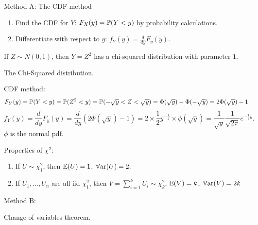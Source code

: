 \documentclass[10pt, a4paper]{article}
\begin{document}
Method A:
The CDF method
\begin{enumerate}[label = (\arabic*)]
    \item Find the CDF for $Y$:
    $F_{X}(y) = \P(Y < y)$ by probability calculations.

    \item Differentiate with respect to $y$:
    $f_Y(y) = \frac{d}{dy}F_y(y)$.
\end{enumerate}

\begin{definition}
    If $Z \sim N(0, 1)$,
    then $Y = Z ^ 2$ has a chi-squared distribution with parameter $1$.
\end{definition}


\begin{example}
    The Chi-Squared distribution.

    CDF method:
    \[
    F_Y(y) = \P(Y < y) = \P(Z ^ 2 < y) = \P(-\sqrt{y} < Z < \sqrt{y}) = \Phi(\sqrt{y}) - \Phi(-\sqrt{y}) = 2\Phi(\sqrt{y}) - 1
    \]
    \[
    f_{Y}(y) = \frac{d}{dy}F_y(y) = \frac{d}{dy}(2\Phi(\sqrt{y}) - 1) = 2 \times \frac{1}{2}y ^ {-\frac{1}{2}} \times \phi(\sqrt{y}) = \frac{1}{\sqrt{y}}\frac{1}{\sqrt{2\pi}}e ^ {-\frac{1}{2}y}.
    \]
    $\phi$ is the normal pdf.
\end{example}

Properties of $\chi ^ 2$:
\begin{enumerate}[label = (\roman*)]
    \item If $U \sim \chi_1 ^ 2$,
    then $\E(U) = 1$,
    $\Var(U) = 2$.

    \item If $U_1, \dotsc, U_n$ are all iid $\chi_1 ^ 2$,
    then $V = \sum_{i = 1}^{k}U_i \sim \chi_k ^ 2$,
    $\E(V) = k$,
    $\Var(V) = 2k$
\end{enumerate}


Method B:

Change of variables theorem.
\end{document}
